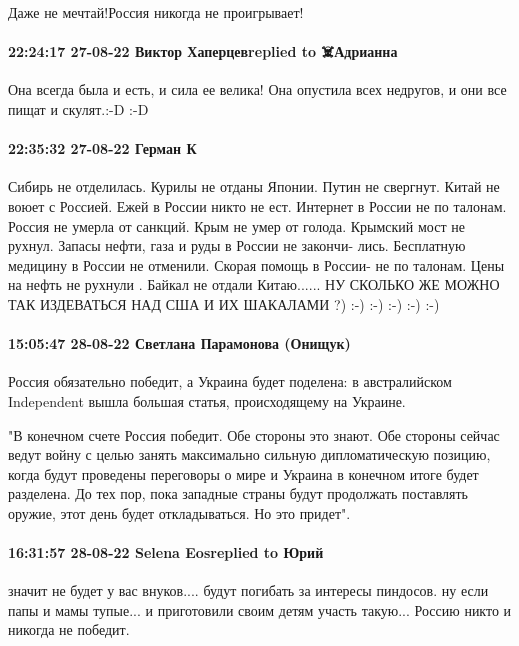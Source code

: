 Даже не мечтай!Россия никогда не проигрывает!

\paragraph{22:24:17 27-08-22 Виктор Хаперцевreplied to ☠️Адрианна}

Она всегда была и есть, и сила ее велика! Она опустила всех недругов, и они все
пищат и скулят.:-D :-D

\paragraph{22:35:32 27-08-22 Герман К}

Сибирь не отделилась. Курилы не отданы Японии. Путин не свергнут. Китай не воюет
с Россией. Ежей в России никто не ест. Интернет в России не по талонам. Россия
не умерла от санкций. Крым не умер от голода. Крымский мост не рухнул. Запасы нефти, газа и руды в России не закончи- лись. Бесплатную медицину в России не отменили. Скорая помощь в России- не по талонам. Цены на нефть не рухнули . Байкал не отдали Китаю......
НУ СКОЛЬКО ЖЕ МОЖНО ТАК ИЗДЕВАТЬСЯ НАД США И ИХ ШАКАЛАМИ ?) :-) :-) :-) :-) :-)

\paragraph{15:05:47 28-08-22 Светлана Парамонова (Онищук)}

Россия обязательно победит, а Украина будет поделена: в австралийском
Independent вышла большая статья, происходящему на Украине.

"В конечном счете Россия победит. Обе стороны это знают. Обе стороны сейчас
ведут войну с целью занять максимально сильную дипломатическую позицию, когда
будут проведены переговоры о мире и Украина в конечном итоге будет разделена.
До тех пор, пока западные страны будут продолжать поставлять оружие, этот день
будет откладываться. Но это придет".


\paragraph{16:31:57 28-08-22 Selena Eosreplied to Юрий}

значит не будет у вас внуков.... будут погибать за интересы пиндосов. ну если
папы и мамы тупые... и приготовили своим детям участь такую... Россию никто и
никогда не победит.

